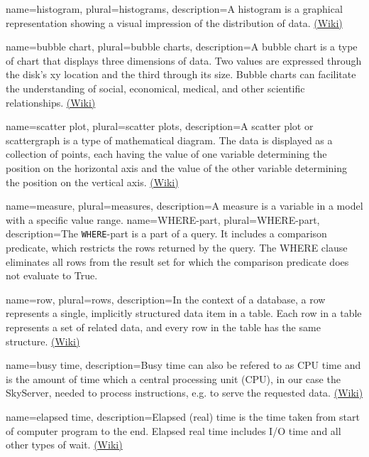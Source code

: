 {
  name=histogram,
  plural=histograms,
  description={A histogram is a graphical representation showing a visual impression of the distribution of data. 
   \href{http://en.wikipedia.org/wiki/Histogram}{(Wiki)}}
}


{
  name=bubble chart,
  plural=bubble charts,
  description={A bubble chart is a type of chart that displays three 
  dimensions of data. Two values are expressed through the disk's xy location and the third 
  through its size. Bubble charts can facilitate the understanding of social,
economical, medical, and other scientific relationships. \href{http://en.wikipedia.org/wiki/Bubble_chart}{(Wiki)}}
}


{
  name=scatter plot,
  plural=scatter plots,
  description={A scatter plot or scattergraph is a type of mathematical diagram. 
  The data is displayed as a collection of points, each having the value of one 
  variable determining the position on the horizontal axis and the value of the other 
  variable determining the position on the vertical axis. \href{http://en.wikipedia.org/wiki/Scatter_plot}{(Wiki)}}
}


{
  name=measure,
  plural=measures,
  description={A measure is a variable in a model with a specific value range.}
}
{
  name=WHERE-part,
  plural=WHERE-part,
  description={The \texttt{WHERE}-part is a part of a \gls{query}. It includes a comparison predicate, 
  which restricts the \glspl{row} returned by the \gls{query}. 
  The WHERE clause eliminates all rows from the result set 
  for which the comparison predicate does not evaluate to True.}
}


{
  name=row,
  plural=rows,
  description={In the context of a \gls{database}, a row represents a single, implicitly 
  structured data item in a table. Each row in a table represents a set of related data, 
  and every row in the table has the same structure.
  \href{(http://en.wikipedia.org/wiki/Row_(database))}{(Wiki)}}
}


{
  name=busy time,
  description={Busy time can also be refered to as CPU time and is the amount of time which a 
  central processing unit (CPU), in our case the \gls{SkyServer}, needed to process instructions,
   e.g. to serve the requested data. \href{(http://en.wikipedia.org/wiki/CPU_time)}{(Wiki)}}
}


{
  name=elapsed time,
  description={Elapsed (real) time is the time taken from start of computer program to the end. 
  Elapsed real time includes I/O time and all other types of wait. 
  \href{(http://en.wikipedia.org/wiki/Elapsed_real_time)}{(Wiki)}}
}


